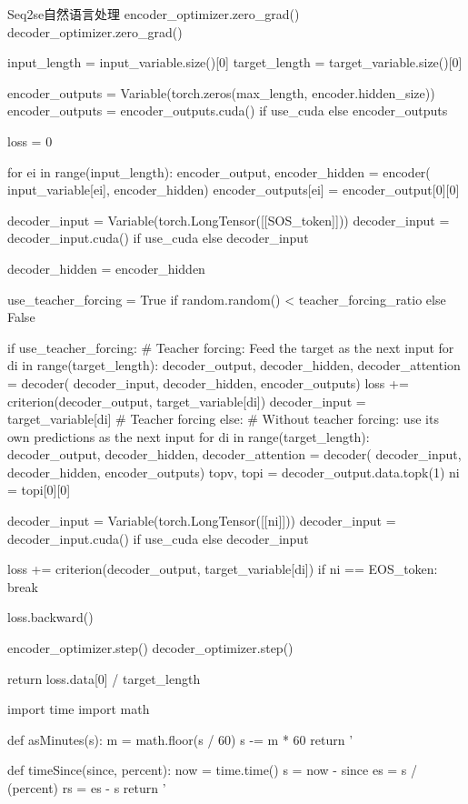 \documentclass[openbib]{article}
\begin{document}
\begin{Python}{Seq2se自然语言处理}
	encoder_optimizer.zero_grad()
	decoder_optimizer.zero_grad()

	input_length = input_variable.size()[0]
	target_length = target_variable.size()[0]

	encoder_outputs = Variable(torch.zeros(max_length, encoder.hidden_size))
	encoder_outputs = encoder_outputs.cuda() if use_cuda else encoder_outputs

	loss = 0

	for ei in range(input_length):
		encoder_output, encoder_hidden = encoder(
			input_variable[ei], encoder_hidden)
		encoder_outputs[ei] = encoder_output[0][0]

	decoder_input = Variable(torch.LongTensor([[SOS_token]]))
	decoder_input = decoder_input.cuda() if use_cuda else decoder_input

	decoder_hidden = encoder_hidden
	
	use_teacher_forcing = True if random.random() < teacher_forcing_ratio else False

	if use_teacher_forcing:
# Teacher forcing: Feed the target as the next input
		for di in range(target_length):
			decoder_output, decoder_hidden, decoder_attention = decoder(
				decoder_input, decoder_hidden, encoder_outputs)
			loss += criterion(decoder_output, target_variable[di])
			decoder_input = target_variable[di]  # Teacher forcing
	else:
# Without teacher forcing: use its own predictions as the next input
		for di in range(target_length):
			decoder_output, decoder_hidden, decoder_attention = decoder(
			decoder_input, decoder_hidden, encoder_outputs)
			topv, topi = decoder_output.data.topk(1)
			ni = topi[0][0]

			decoder_input = Variable(torch.LongTensor([[ni]]))
			decoder_input = decoder_input.cuda() if use_cuda else decoder_input

			loss += criterion(decoder_output, target_variable[di])
			if ni == EOS_token:
				break

	loss.backward()

	encoder_optimizer.step()
	decoder_optimizer.step()

	return loss.data[0] / target_length

import time
import math

def asMinutes(s):
	m = math.floor(s / 60)
	s -= m * 60
	return '%

def timeSince(since, percent):
	now = time.time()
	s = now - since
	es = s / (percent)
	rs = es - s
	return '%


\end{Python}
\end{document}
